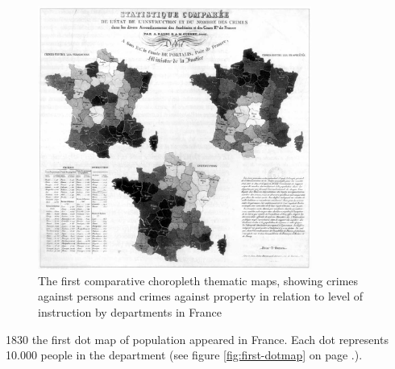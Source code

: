 \begin{figure}[h]
\centering
\includegraphics[width=0.8\textwidth,keepaspectratio]{images/history/second-choropleth.jpg}
\caption[
    The first comparative choropleth thematic maps, showing crimes against persons and crimes against property in relation to level of instruction by departments in France, Urldate: 07.2016 \newline
\small\texttt{\url{http://datavis.ca/milestones//admin/uploads/images/guerry/guerry-balbi-600s.jpg}}
]{The first comparative choropleth thematic maps, showing crimes against persons and crimes against property in relation to level of instruction by departments in France}
\label{fig:second-choropleth}
\end{figure}

1830 the first dot map of population appeared in France. Each dot represents 10.000 people in the department (see figure \ref{fig:first-dotmap} on page \pageref{fig:first-dotmap}.).

